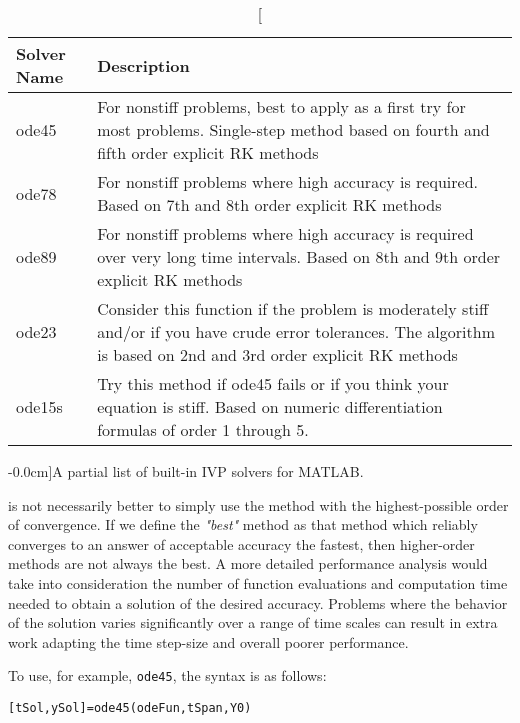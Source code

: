 \begin{table}[h]
\centering
\begin{tabular}{|p{1.25in}|p{3.0in}|}
\hline
\textbf{Solver Name} & \textbf{Description} \\
\hline
ode45 & For nonstiff problems, best to apply as a first try for most problems. Single-step method based on fourth and fifth order explicit RK methods \\ \hline
ode78 & For nonstiff problems where high accuracy is required.  Based on 7th and 8th order explicit RK methods \\ \hline
ode89 & For nonstiff problems where high accuracy is required over very long time intervals. Based on 8th and 9th order explicit RK methods\\ \hline
ode23 & Consider this function if the problem is moderately stiff and/or if you have crude error tolerances. The algorithm is based on 2nd and 3rd order explicit RK methods\\ \hline
ode15s & Try this method if ode45 fails or if you think your equation is stiff. Based on numeric differentiation formulas of order 1 through 5. \\ \hline
\end{tabular}
\caption[][-0.0cm]{A partial list of built-in IVP solvers for MATLAB.}
\label{tab:lec27n-1}
\end{table}

 is not necessarily better to simply use the method with the highest-possible order of convergence.  If we define the \emph{"best"} method as that method which reliably converges to an answer of acceptable accuracy the fastest, then higher-order methods are not always the best.  A more detailed performance analysis would take into consideration the number of function evaluations and computation time needed to obtain a solution of the desired accuracy.  Problems where the behavior of the solution varies significantly over a range of time scales can result in extra work adapting the time step-size and overall poorer performance.

To use, for example, \lstinline[style=myMatlab]{ode45}, the syntax is as follows:


\vspace{0.25cm}

\noindent\parbox{\textwidth}{
\centering
\lstinline[style=myMatlab]{[tSol,ySol]=ode45(odeFun,tSpan,Y0)}
}

